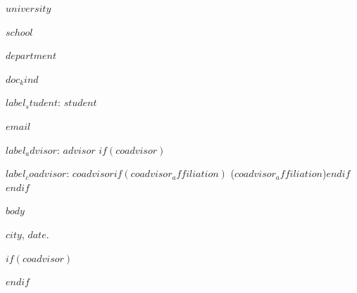 \documentclass[a4paper,12pt,oneside,openany]{report}
\begin{document}
\begin{center}
\textbf{$university$}
\vspace{-0.2cm}

\textbf{$school$}
\vspace{-0.2cm}

\textbf{$department$}
\vspace{0.8cm}

\underline{\textbf{$doc_kind$}}

$label_student$: $student$
\vspace{-0.2cm}

$email$

$label_advisor$: $advisor$
$if(coadvisor)$
\vspace{-0.2cm}

$label_coadvisor$: $coadvisor$$if(coadvisor_affiliation)$ ($coadvisor_affiliation$)$endif$
$endif$
\end{center}

$body$

      \vspace{1cm}
      \noindent
$city$, $date$.

      \vspace{0.5cm}
      \begin{flushright}
         \parbox{10cm}{
            \hrulefill

            \vspace{-.375cm}

            \vspace{0.9cm}
            \hrulefill

            \vspace{-.375cm}

$if(coadvisor)$
            \vspace{0.9cm}
            \hrulefill

            \vspace{-.375cm}

$endif$
         }
      \end{flushright}
      \vfill
\end{document}
